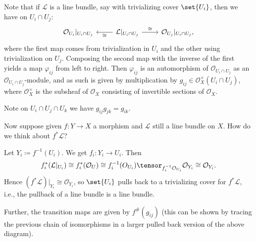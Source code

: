 Note that if $\mathcal{L}$ is a line bundle, say with trivializing cover $\set{U_i}$, then
we have on $U_i\cap U_j$:
\[\begin{tikzcd}
	\mathcal{O}_{U_i}|_{U_i\cap U_j} & \mathcal{L}|_{U_i \cap U_j}\ar[l, "\cong"]\ar[r, "\cong"] & \mathcal{O}_{U_j}|_{U_i\cap U_j},
\end{tikzcd}\]
where the first map comes from trivialization in $U_i$ and the other using trivialization
on $U_j$. Composing the second map with the inverse of the first yields a map $\varphi_{ij}$
from left to right. Then $\varphi_{ij}$ is an automorphism of
$\mathcal{O}_{U_i\cap U_j}$ as an $\mathcal{O}_{U_i\cap U_j}$-module, and as such
is given by multiplication by $g_{ij} \in \mathcal{O}_X^{\times}(U_i\cap U_j)$,
where $\mathcal{O}_X^{\times}$ is the subsheaf of $\mathcal{O}_X$ consisting of
invertible sections of $\mathcal{O}_X$.

Note on $U_i\cap U_j\cap U_k$ we have $g_{ij}g_{jk} = g_{ik}$.

Now suppose given $f\colon Y\to X$ a morphism and $\mathcal{L}$ still a line bundle
on $X$. How do we think about $f^*\mathcal{L}$?

Let $Y_i\coloneqq f^{-1}(U_i)$. We get $f_i\colon Y_i\to U_i$. Then
\[ f_i^*(\mathcal{L}|_{U_i})\cong f_i^*(\mathcal{O}_U)\cong f_i^{-1}(O_{U_i})\tensor_{f_i^{-1}\mathcal{O}_{U_i}}\mathcal{O}_{Y_i}\cong \mathcal{O}_{Y_i}. \]
Hence $(f^*\mathcal{L})|_{Y_i}\cong \mathcal{O}_{Y_i}$, so $\set{U_i}$ pulls back to
a trivializing cover for $f^*\mathcal{L}$, i.e., the pullback of a line bundle is a line
bundle.

Further, the transition maps are given by $f^\#(g_{ij})$ (this can be shown by
tracing the previous chain of isomorphisms in a larger pulled back version of the above
diagram).
